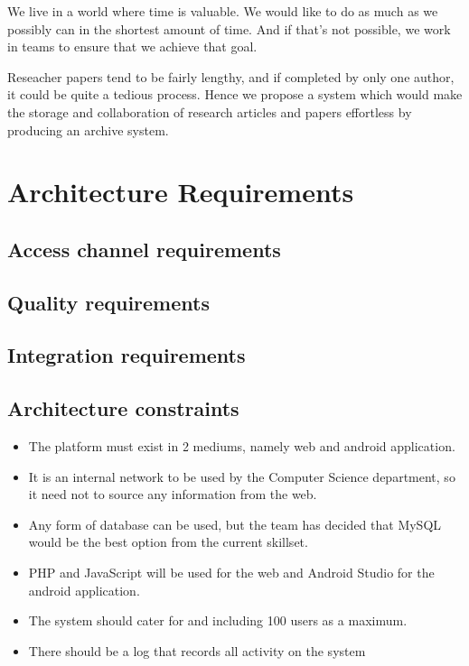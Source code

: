 \documentclass[a4paper,12pt]{report}
\begin{document}
We live in a world where time is valuable. We would like to do as much as we possibly can in the shortest amount of time. And if that's not possible, we work in teams to ensure that we achieve that goal. 

Reseacher papers tend to be fairly lengthy, and if completed by only one author, it could be quite a tedious process. Hence we propose a system which would make the storage and collaboration of research articles and papers effortless by producing an archive system.

\section{Architecture Requirements}

\subsection{Access channel requirements}

\subsection{Quality requirements}

\subsection{Integration requirements}

\subsection{Architecture constraints}
\begin{itemize}
	\item The platform must exist in 2 mediums, namely web and android application.
	\item It is an internal network to be used by the Computer Science department, so it need not to source any information from the web.
	\item Any form of database can be used, but the team has decided that MySQL would be the best option from the current skillset.
	\item PHP and JavaScript will be used for the web and Android Studio for the android application.
	\item The system should cater for and including 100 users as a maximum.
	\item There should be a log that records all activity on the system
\end{itemize} 
\end{document}
